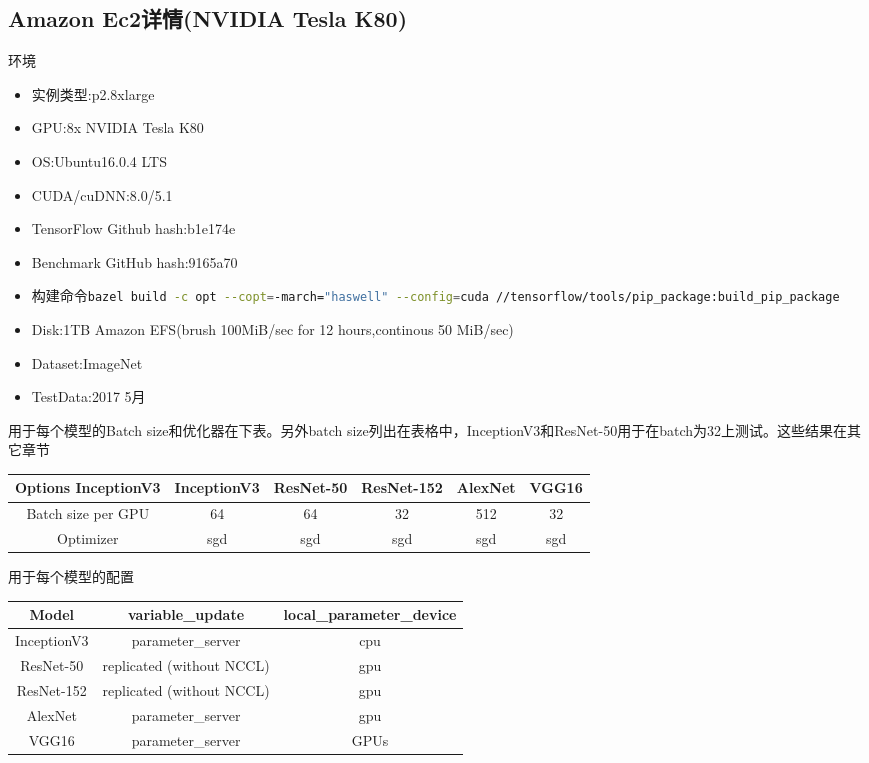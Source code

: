 \subsection{Amazon Ec2详情(NVIDIA Tesla K80)}
环境
\begin{itemize}
	\item 实例类型:p2.8xlarge
	\item GPU:8x NVIDIA Tesla K80
	\item OS:Ubuntu16.0.4 LTS 
	\item CUDA/cuDNN:8.0/5.1
	\item TensorFlow Github hash:b1e174e
	\item Benchmark GitHub hash:9165a70
	\item 构建命令\lstinline[language=Bash]{bazel build -c opt --copt=-march="haswell" --config=cuda //tensorflow/tools/pip_package:build_pip_package}
	\item Disk:1TB Amazon EFS(brush 100MiB/sec for 12 hours,continous 50 MiB/sec)
	\item Dataset:ImageNet 
	\item TestData:2017 5月
\end{itemize}
用于每个模型的Batch size和优化器在下表。另外batch size列出在表格中，InceptionV3和ResNet-50用于在batch为32上测试。这些结果在其它章节
\begin{table}[!h]
	\centering
\begin{tabular}{|c|c|c|c|c|c|}
		\hline
	Options	InceptionV3	&InceptionV3    &ResNet-50	&ResNet-152	&AlexNet	&VGG16\\
		\hline
	Batch size per GPU	&64	&64	&32	&512	&32\\
		\hline
	Optimizer	&sgd	&sgd	&sgd	&sgd	&sgd\\
		\hline
\end{tabular}
\end{table}
用于每个模型的配置
\begin{table}[H]
	\centering
	\begin{tabular}{|c|c|c|}
		\hline
		Model	&variable\_update	&local\_parameter\_device\\
		\hline
		InceptionV3	&parameter\_server	&cpu\\
		\hline
		ResNet-50	&replicated (without NCCL)	&gpu\\
		\hline
		ResNet-152	&replicated (without NCCL)	&gpu\\
		\hline
		AlexNet	&parameter\_server	&gpu\\
		\hline
		VGG16	&parameter\_server	&GPUs \\
		\hline
	\end{tabular}
\end{table}
